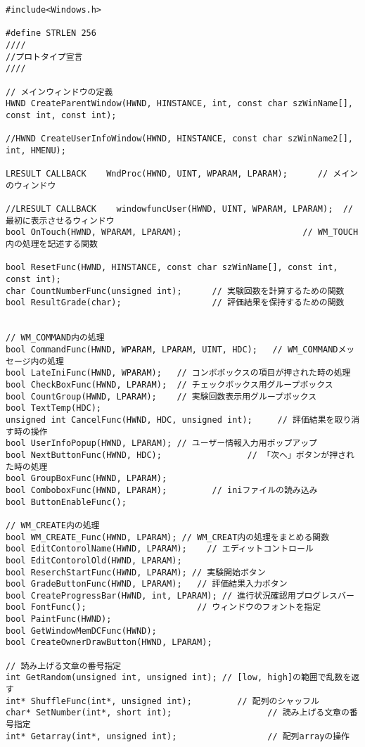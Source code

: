 \begin{lstlisting}[caption=main.h]
#include<Windows.h>

#define STRLEN 256
////
//プロトタイプ宣言
////

// メインウィンドウの定義
HWND CreateParentWindow(HWND, HINSTANCE, int, const char szWinName[], const int, const int);

//HWND CreateUserInfoWindow(HWND, HINSTANCE, const char szWinName2[], int, HMENU);

LRESULT CALLBACK	WndProc(HWND, UINT, WPARAM, LPARAM);      // メインのウィンドウ
			
//LRESULT CALLBACK    windowfuncUser(HWND, UINT, WPARAM, LPARAM);  // 最初に表示させるウィンドウ
bool OnTouch(HWND, WPARAM, LPARAM);                        // WM_TOUCH内の処理を記述する関数

bool ResetFunc(HWND, HINSTANCE, const char szWinName[], const int, const int);
char CountNumberFunc(unsigned int);      // 実験回数を計算するための関数
bool ResultGrade(char);                  // 評価結果を保持するための関数


// WM_COMMAND内の処理
bool CommandFunc(HWND, WPARAM, LPARAM, UINT, HDC);   // WM_COMMANDメッセージ内の処理
bool LateIniFunc(HWND, WPARAM);   // コンボボックスの項目が押された時の処理
bool CheckBoxFunc(HWND, LPARAM);  // チェックボックス用グループボックス
bool CountGroup(HWND, LPARAM);    // 実験回数表示用グループボックス
bool TextTemp(HDC);
unsigned int CancelFunc(HWND, HDC, unsigned int);     // 評価結果を取り消す時の操作
bool UserInfoPopup(HWND, LPARAM); // ユーザー情報入力用ポップアップ
bool NextButtonFunc(HWND, HDC);                 // 「次へ」ボタンが押された時の処理
bool GroupBoxFunc(HWND, LPARAM);
bool ComboboxFunc(HWND, LPARAM);         // iniファイルの読み込み
bool ButtonEnableFunc();

// WM_CREATE内の処理
bool WM_CREATE_Func(HWND, LPARAM); // WM_CREAT内の処理をまとめる関数
bool EditContorolName(HWND, LPARAM);    // エディットコントロール
bool EditContorolOld(HWND, LPARAM);
bool ReserchStartFunc(HWND, LPARAM); // 実験開始ボタン
bool GradeButtonFunc(HWND, LPARAM);   // 評価結果入力ボタン
bool CreateProgressBar(HWND, int, LPARAM); // 進行状況確認用プログレスバー
bool FontFunc();                      // ウィンドウのフォントを指定
bool PaintFunc(HWND);
bool GetWindowMemDCFunc(HWND);
bool CreateOwnerDrawButton(HWND, LPARAM);

// 読み上げる文章の番号指定
int GetRandom(unsigned int, unsigned int); // [low, high]の範囲で乱数を返す
int* ShuffleFunc(int*, unsigned int);         // 配列のシャッフル
char* SetNumber(int*, short int);                   // 読み上げる文章の番号指定
int* Getarray(int*, unsigned int);                  // 配列arrayの操作


\end{lstlisting}
